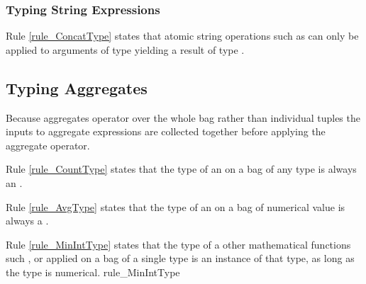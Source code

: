\subsubsection{Typing String Expressions}
Rule \ref{rule_ConcatType} states that atomic string operations
such as  can only be applied to arguments of type  yielding a
result of type .



\subsection{Typing Aggregates}

Because aggregates operator over the whole bag rather than individual tuples the inputs to aggregate expressions are collected together before applying the aggregate operator.

Rule \ref{rule_CountType} states that the type of an  on a bag of any type is always an .

Rule \ref{rule_AvgType} states that the type of an  on a bag of numerical value is always a .

Rule \ref{rule_MinIntType} states that the type of a other mathematical functions such ,  or  applied on a bag of a single type is an instance of that type, as long as the type is numerical.
{rule_MinIntType}
